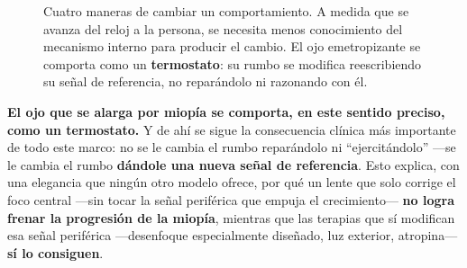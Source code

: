 \documentclass[10pt,a4paper]{article}
\providecommand{\enquote}[1]{``#1''}
\begin{document}
\begin{figure}[h]
\centering
{}
\caption{Cuatro maneras de cambiar un comportamiento. A medida que se avanza del reloj a la persona, se necesita menos conocimiento del mecanismo interno para producir el cambio. El ojo emetropizante se comporta como un \textbf{termostato}: su rumbo se modifica reescribiendo su se\~nal de referencia, no repar\'andolo ni razonando con \'el.}
\label{fig:persuad_eje}
\end{figure}

\textbf{El ojo que se alarga por miop\'ia se comporta, en este sentido preciso, como un termostato.} Y de ah\'i se sigue la consecuencia cl\'inica m\'as importante de todo este marco: no se le cambia el rumbo repar\'andolo ni \enquote{ejercit\'andolo} ---se le cambia el rumbo \textbf{d\'andole una nueva se\~nal de referencia}. Esto explica, con una elegancia que ning\'un otro modelo ofrece, por qu\'e un lente que solo corrige el foco central ---sin tocar la se\~nal perif\'erica que empuja el crecimiento--- \textbf{no logra frenar la progresi\'on de la miop\'ia}, mientras que las terapias que s\'i modifican esa se\~nal perif\'erica ---desenfoque especialmente dise\~nado, luz exterior, atropina--- \textbf{s\'i lo consiguen}.
\end{document}
